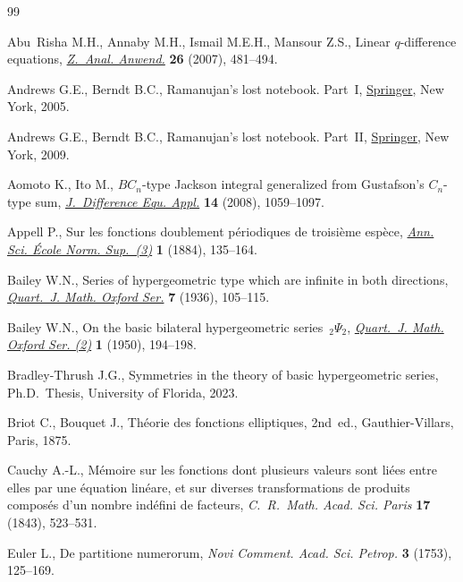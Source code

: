 \begin{thebibliography}{99}
\footnotesize\itemsep=0pt

Abu~Risha M.H., Annaby M.H., Ismail M.E.H., Mansour Z.S., Linear
 {$q$}-difference equations,
 \href{https://doi.org/10.4171/ZAA/1338}{\textit{Z.~Anal. Anwend.}}
 \textbf{26} (2007), 481--494.

Andrews G.E., Berndt B.C., Ramanujan's lost notebook. {P}art~{I},
 \href{https://doi.org/10.1007/0-387-28124-X}{Springer}, New York, 2005.

Andrews G.E., Berndt B.C., Ramanujan's lost notebook. {P}art~{II},
 \href{https://doi.org/10.1007/b13290}{Springer}, New York, 2009.

Aomoto K., Ito M., {$BC_n$}-type {J}ackson integral generalized from
 {G}ustafson's {$C_n$}-type sum,
 \href{https://doi.org/10.1080/10236190701776043}{\textit{J.~Difference Equ.
 Appl.}} \textbf{14} (2008), 1059--1097.

Appell P., Sur les fonctions doublement p\'eriodiques de troisi\`eme esp\`ece,
 \href{https://doi.org/10.24033/asens.236}{\textit{Ann. Sci. \'Ecole Norm.
 Sup.~(3)}} \textbf{1} (1884), 135--164.

Bailey W.N., Series of hypergeometric type which are infinite in both
 directions, \href{https://doi.org/10.1093/qmath/os-7.1.105}{\textit{Quart.~J.
 Math. Oxford Ser.}} \textbf{7} (1936), 105--115.

Bailey W.N., On the basic bilateral hypergeometric series~{${}_2\Psi_2$},
 \href{https://doi.org/10.1093/qmath/1.1.194}{\textit{Quart.~J. Math. Oxford
 Ser. (2)}} \textbf{1} (1950), 194--198.

Bradley-Thrush J.G., Symmetries in the theory of basic hypergeometric series,
 Ph.D.~Thesis, {U}niversity of Florida, 2023.

Briot C., Bouquet J., Th\'eorie des fonctions elliptiques, 2nd~ed.,
 Gauthier-Villars, Paris, 1875.

Cauchy A.-L., M\'emoire sur les fonctions dont plusieurs valeurs sont li\'ees
 entre elles par une \'equation lin\'eare, et sur diverses transformations de
 produits composés d'un nombre ind\'efini de facteurs, \textit{C.~R.~Math.
 Acad. Sci. Paris} \textbf{17} (1843), 523--531.

Euler L., De partitione numerorum, \textit{Novi Comment. Acad. Sci. Petrop.}
 \textbf{3} (1753), 125--169.


\end{thebibliography}
